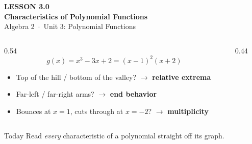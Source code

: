 \documentclass[aspectratio=169, 11pt]{beamer}
\newcommand{\lgrid}[4]{%
  \draw[step=1, linegray!45, thin] (#1,#3) grid (#2,#4);
  \draw[->, thick, charcoal] (#1,0)--(#2,0) node[below right, font=\tiny]{$x$};
  \draw[->, thick, charcoal] (0,#3)--(0,#4) node[left, font=\tiny]{$y$};}
\begin{document}
{
\begin{frame}[plain]
  \vspace{2.8cm}\hspace{0.55cm}%
  \begin{minipage}{0.9\textwidth}
    {\color{goldacc}\bfseries\small LESSON 3.0}\\[0.5cm]
    {\color{white}\bfseries\LARGE Characteristics of Polynomial Functions}\\[1.2cm]
    {\color{forestmid}\small Algebra 2~$\cdot$~Unit 3: Polynomial Functions}
  \end{minipage}
\end{frame}
}

\begin{frame}[t, plain]
  \begin{columns}[T]
    \begin{column}{0.54\textwidth}
      \[ g(x) = x^3 - 3x + 2 = (x-1)^2(x+2) \]
      \begin{itemize}\setlength{\itemsep}{4pt}
        \item Top of the hill / bottom of the valley? $\to$ \textbf{relative extrema}
        \item Far-left / far-right arms? $\to$ \textbf{end behavior}
        \item Bounces at $x=1$, cuts through at $x=-2$? $\to$ \textbf{multiplicity}
      \end{itemize}
    \end{column}
    \begin{column}{0.44\textwidth}
      \centering
    \end{column}
  \end{columns}
  \vspace{2pt}
  \begin{block}{Today}
    Read \emph{every} characteristic of a polynomial straight off its graph.
  \end{block}
\end{frame}
\end{document}
